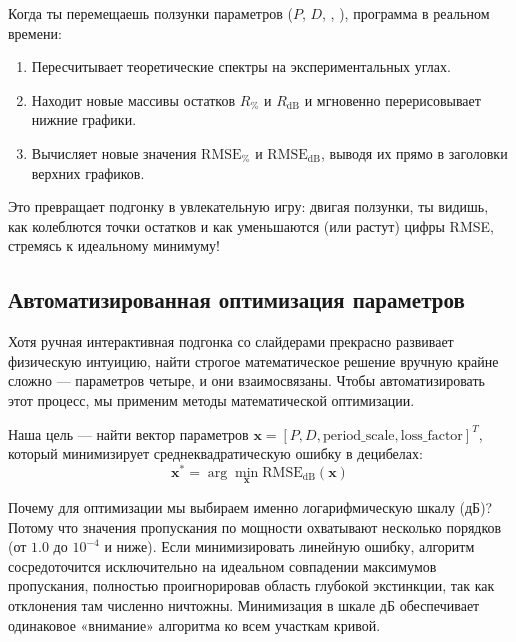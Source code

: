 
Когда ты перемещаешь ползунки параметров ($P$, $D$, , ), программа в реальном времени:
\begin{enumerate}
    \item Пересчитывает теоретические спектры на экспериментальных углах.
    \item Находит новые массивы остатков $R_{\%}$ и $R_{\text{dB}}$ и мгновенно перерисовывает нижние графики.
    \item Вычисляет новые значения $\text{RMSE}_{\%}$ и $\text{RMSE}_{\text{dB}}$, выводя их прямо в заголовки верхних графиков.
\end{enumerate}
Это превращает подгонку в увлекательную игру: двигая ползунки, ты видишь, как колеблются точки остатков и как уменьшаются (или растут) цифры RMSE, стремясь к идеальному минимуму!

\subsection{Автоматизированная оптимизация параметров}

Хотя ручная интерактивная подгонка со слайдерами прекрасно развивает физическую интуицию, найти строгое математическое решение вручную крайне сложно — параметров четыре, и они взаимосвязаны. Чтобы автоматизировать этот процесс, мы применим методы математической оптимизации.

Наша цель — найти вектор параметров $\mathbf{x} = [P, D, \text{period\_scale}, \text{loss\_factor}]^T$, который минимизирует среднеквадратическую ошибку в децибелах:
\begin{equation}
\mathbf{x}^* = \arg\min_{\mathbf{x}} \text{RMSE}_{\text{dB}}(\mathbf{x})
\end{equation}

Почему для оптимизации мы выбираем именно логарифмическую шкалу (дБ)? Потому что значения пропускания по мощности охватывают несколько порядков (от $1.0$ до $10^{-4}$ и ниже). Если минимизировать линейную ошибку, алгоритм сосредоточится исключительно на идеальном совпадении максимумов пропускания, полностью проигнорировав область глубокой экстинкции, так как отклонения там численно ничтожны. Минимизация в шкале дБ обеспечивает одинаковое «внимание» алгоритма ко всем участкам кривой.


